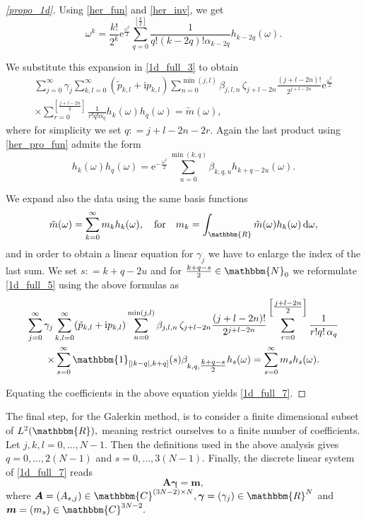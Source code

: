 \documentclass[a4paper,twoside,10pt]{article}
\theoremstyle{break}
\theoremstyle{nonumberplain}
\newtheorem{proof}{Proof}
\newcommand{\R}{\mathbbm{R}}
\newcommand{\C}{\mathbbm{C}}
\newcommand{\N}{\mathbbm{N}}
\renewcommand{\b}{\bm}
\newcommand{\id}{\mathbbm{1}}
\newcommand{\e}{\mathrm e}
\renewcommand{\i}{\mathrm i}
\renewcommand{\d}{\,\mathrm d}
\begin{document}
\begin{proof}[\autoref{propo_1d}]
Using \eqref{her_fun} and  \eqref{her_inv}, we get
 \begin{equation}\label{her_inv_fun}
\omega^k = \frac{k!}{2^k} \e^{\tfrac{\omega^2}2}\sum_{q=0}^{\left[ \tfrac{k}{2}\right] } \frac{1}{q!(k-2q)! \alpha_{k-2q}}  h_{k-2q} (\omega) .
\end{equation}

We substitute this expansion in \eqref{1d_full_3} to obtain
\begin{multline}\label{1d_full_5}
\sum_{j=0}^\infty \gamma_j \sum_{k,l=0}^\infty (\tilde p_{k,l} +\i p_{k,l} )  \sum_{n=0}^{\min (j,l)} \beta_{j,l,n} \,\zeta_{j+l-2n}\frac{(j+l-2n)!}{2^{j+l-2n}} \e^{\tfrac{\omega^2}2} \\
\times \sum_{r=0}^{\left[ \tfrac{j+l-2n}{2}\right] } \frac{1}{r!q! \alpha_q} h_k (\omega) h_q (\omega)= \tilde m (\omega) ,
\end{multline}
where for simplicity we set $q: = j+l-2n-2r .$ Again the last product using \eqref{her_pro_fun} admits the form
\[
h_k (\omega) h_q (\omega)= \e^{-\tfrac{\omega^2}2} \sum_{u=0}^{\min (k,q)} \beta_{k,q,u} h_{k+q-2u} (\omega) .
\]

We expand also the data using the same basis functions
\begin{equation*}%
\tilde m (\omega) = \sum_{k=0}^\infty m_k h_k (\omega), \quad \text{for} \quad m_k = \int_\R \tilde m (\omega) h_k(\omega) \d 
\omega  ,
\end{equation*}
and in order to obtain a linear equation for $\gamma_j$ we have to enlarge the index of the last sum. We set $s: = k+q-2u$ and for $\tfrac{k+q-s}2 \in \N_0$ we reformulate \eqref{1d_full_5} using the above formulas as
\begin{multline*}%
\sum_{j=0}^\infty \gamma_j \sum_{k,l=0}^\infty (\tilde p_{k,l} +\i p_{k,l} )  \sum_{n=0}^{\min (j,l)} \beta_{j,l,n} \,\zeta_{j+l-2n}\frac{(j+l-2n)!}{2^{j+l-2n}} 
\sum_{r=0}^{\left[ \tfrac{j+l-2n}{2}\right] } \frac{1}{r!q! \,\alpha_q} \\ \times \sum_{s=0}^\infty \id_{[\vert k-q\vert,k+q ]} (s) \beta_{k,q,\tfrac{k+q-s}2} h_s (\omega) = \sum_{s=0}^\infty m_s h_s (\omega) .
\end{multline*}

Equating the coefficients in the above equation yields \eqref{1d_full_7}.
\end{proof}


The final step, for the Galerkin method, is to consider a finite dimensional subset of $L^2 (\R ),$ meaning restrict ourselves to a finite number of coefficients. Let $j,k,l = 0,...,N-1 .$ Then the definitions used in the above analysis gives $q = 0,...,2(N-1)$ and $s=0,...,3(N-1).$ Finally, the discrete linear system of \eqref{1d_full_7} reads
\begin{equation}\label{eq_final_1d}
\b A \bm \gamma = \b m ,
\end{equation}
where $\b A = (A_{s,j}) \in \C^{(3N-2)\times N}, \bm \gamma =(\gamma_j)\in \R^N$ and $\b m = (m_s)\in \C^{3N-2}.$
\end{document}
